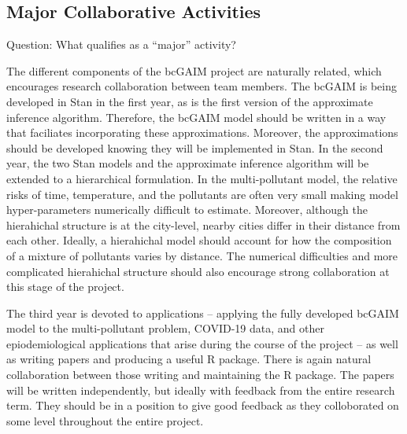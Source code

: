 \documentclass[12pt,letterpaper]{article}
\begin{document}
\clearpage

\hypertarget{major-collaborative-activities}{%
\subsection{Major Collaborative
Activities}\label{major-collaborative-activities}}

Question: What qualifies as a ``major'' activity?

The different components of the bcGAIM project are naturally related,
which encourages research collaboration between team members. The bcGAIM
is being developed in Stan in the first year, as is the first version of
the approximate inference algorithm. Therefore, the bcGAIM model should
be written in a way that faciliates incorporating these approximations.
Moreover, the approximations should be developed knowing they will be
implemented in Stan. In the second year, the two Stan models and the
approximate inference algorithm will be extended to a hierarchical
formulation. In the multi-pollutant model, the relative risks of time,
temperature, and the pollutants are often very small making model
hyper-parameters numerically difficult to estimate. Moreover, although
the hierahichal structure is at the city-level, nearby cities differ in
their distance from each other. Ideally, a hierahichal model should
account for how the composition of a mixture of pollutants varies by
distance. The numerical difficulties and more complicated hierahichal
structure should also encourage strong collaboration at this stage of
the project.

The third year is devoted to applications -- applying the fully
developed bcGAIM model to the multi-pollutant problem, COVID-19 data,
and other epiodemiological applications that arise during the course of
the project -- as well as writing papers and producing a useful R
package. There is again natural collaboration between those writing and
maintaining the R package. The papers will be written independently, but
ideally with feedback from the entire research term. They should be in a
position to give good feedback as they colloborated on some level
throughout the entire project.
\end{document}
